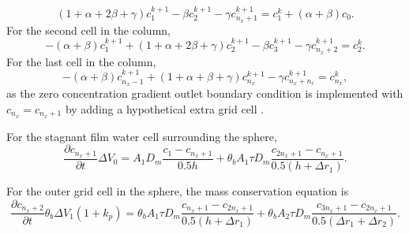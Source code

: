 \documentclass{article}
\begin{document}
\begin{equation}
(1 + \alpha + 2 \beta + \gamma) c_1^{k+1}  - \beta c_2^{k+1} - \gamma c_{n_x+1}^{k+1} = c_1^k + (\alpha + \beta) c_0.
\end{equation}
For the second cell in the column, 
\begin{equation}
-(\alpha + \beta)c_1^{k+1}  + (1 +  \alpha + 2 \beta + \gamma ) c_2^{k+1}  - \beta c_3^{k+1}- \gamma c_{n_x+2}^{k+1} =  c_2^k .
\end{equation}
For the last cell in the column,
\begin{equation}
-(\alpha + \beta)c_{n_x-1}^{k+1}  + (1 +  \alpha + \beta + \gamma ) c_{n_x}^{k+1}  - \gamma c_{n_x+n_r}^{k+1} =  c_{n_x}^k,
\end{equation}
as the zero concentration gradient outlet boundary condition is implemented with $c_{n_x} = c_{n_x+1}$ by adding a hypothetical extra grid cell \cite{Zheng2002}.

For the stagnant film water cell surrounding the sphere, 
\begin{equation}
\frac{\partial c_{n_x+1}}{\partial t}\Delta V_0 =  A_1 D_m \frac{c_1 - c_{n_x+1}}{0.5h} +  \theta_b A_1\tau D_m \frac{c_{2n_x+1} - c_{n_x+1}}{0.5(h + \Delta r_1)}.
\end{equation}

For the outer grid cell in the sphere, the mass conservation equation is
\begin{equation}
\frac{\partial c_{n_x+2}}{\partial t}\theta_b\Delta V_1 (1 + k_p) =  \theta_b A_1\tau D_m \frac{c_{n_x+1} - c_{2n_x+1}}{0.5(h+\Delta r_1)} +  \theta_b A_2\tau D_m \frac{c_{3n_x+1} - c_{2n_x+1}}{0.5(\Delta r_1 + \Delta r_2)}.
\end{equation}
\end{document}
